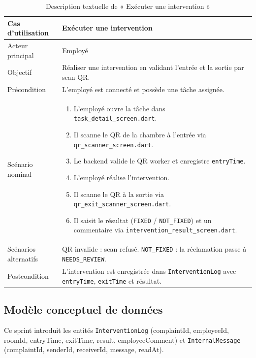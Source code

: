 \begin{table}[H]
\centering
\caption{Description textuelle de « Exécuter une intervention »}
\small
\begin{tabularx}{\textwidth}{|p{3.5cm}|X|}
\hline
Cas d'utilisation & Exécuter une intervention \\ \hline
Acteur principal & Employé \\ \hline
Objectif & Réaliser une intervention en validant l'entrée et la sortie par scan QR. \\ \hline
Précondition & L'employé est connecté et possède une tâche assignée. \\ \hline
Scénario nominal &
\begin{enumerate}[nosep]
\item L'employé ouvre la tâche dans \texttt{task\_detail\_screen.dart}.
\item Il scanne le QR de la chambre à l'entrée via \texttt{qr\_scanner\_screen.dart}.
\item Le backend valide le QR worker et enregistre \texttt{entryTime}.
\item L'employé réalise l'intervention.
\item Il scanne le QR à la sortie via \texttt{qr\_exit\_scanner\_screen.dart}.
\item Il saisit le résultat (\texttt{FIXED} / \texttt{NOT\_FIXED}) et un commentaire via \texttt{intervention\_result\_screen.dart}.
\end{enumerate} \\ \hline
Scénarios alternatifs & QR invalide : scan refusé. \texttt{NOT\_FIXED} : la réclamation passe à \texttt{NEEDS\_REVIEW}. \\ \hline
Postcondition & L'intervention est enregistrée dans \texttt{InterventionLog} avec \texttt{entryTime}, \texttt{exitTime} et résultat. \\ \hline
\end{tabularx}
\end{table}

\subsection{Modèle conceptuel de données}
Ce sprint introduit les entités \texttt{InterventionLog} (complaintId, employeeId, roomId, entryTime, exitTime, result, employeeComment) et \texttt{InternalMessage} (complaintId, senderId, receiverId, message, readAt).


